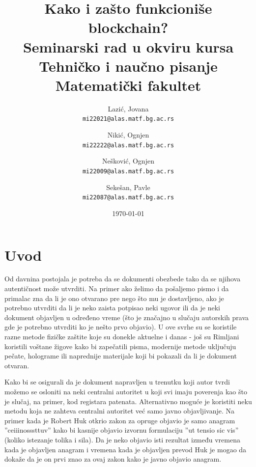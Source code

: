 \documentclass[a4paper]{article}
\begin{document}
\title{Kako i zašto funkcioniše blockchain?\\ \small{Seminarski rad u okviru kursa\\Tehničko i naučno pisanje\\ Matematički fakultet}}
\author{
    Lazić, Jovana\\ 
    \texttt{mi22021@alas.matf.bg.ac.rs}
    \and
    Nikić, Ognjen\\ 
    \texttt{mi22222@alas.matf.bg.ac.rs}
    \and
    Nešković, Ognjen\\ 
    \texttt{mi22009@alas.matf.bg.ac.rs}
    \and
    Sekešan, Pavle\\ 
    \texttt{mi22087@alas.matf.bg.ac.rs}
}
\date{\today}
\maketitle

\tableofcontents

\newpage

\section{Uvod}
\label{sec:uvod}
Od davnina postojala je potreba da se dokumenti obezbede tako da se njihova autentičnost 
može utvrditi. Na primer ako želimo da pošaljemo pismo i da primalac zna da li je ono 
otvarano pre nego što mu je dostavljeno, ako je potrebno utvrditi da li je neko zaista 
potpisao neki ugovor ili da je neki dokument objavljen u određeno vreme (što je značajno
u slučaju autorskih prava gde je potrebno utvrditi ko je nešto prvo objavio).
U ove svrhe su se koristile razne metode fizičke zaštite koje su donekle aktuelne i danas -
još su Rimljani koristili voštane žigove kako bi zapečatili pisma, modernije metode uključuju
pečate, holograme ili naprednije materijale koji bi pokazali da li je dokument otvaran.

Kako bi se osigurali da je dokument napravljen u trenutku koji autor tvrdi možemo se osloniti
na neki centralni autoritet u koji svi imaju poverenja kao što je slučaj, na primer, kod registara patenata.
Alternativno moguće je koristiti neku metodu koja ne zahteva centralni autoritet već samo
javno objavljivanje. Na primer kada je Robert Huk otkrio zakon za opruge objavio je samo anagram
''ceiiinosssttuv'' kako bi kasnije objavio izvornu formulaciju ''ut tensio sic vis'' (koliko istezanje tolika i sila).
Da je neko objavio isti rezultat između vremena kada je objavljen anagram i vremena kada je objavljen prevod
Huk je mogao da dokaže da je on prvi znao za ovaj zakon kako je javno objavio anagram.
\end{document}
